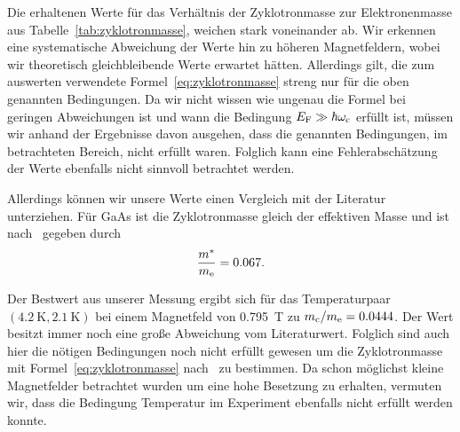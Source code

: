 \documentclass[paper=a4,fontsize=10pt,DIV=18,twocolumn,parskip=half]{scrartcl}
\numberwithin{equation}{section}    %
\newcommand{\kor}[1]{{\color{darkgreen}#1}}
\begin{document}
\kor{
Die erhaltenen Werte für das Verhältnis der Zyklotronmasse zur Elektronenmasse aus Tabelle~\ref{tab:zyklotronmasse}, weichen stark voneinander ab. Wir erkennen eine systematische Abweichung der Werte hin zu höheren Magnetfeldern, wobei wir theoretisch gleichbleibende Werte erwartet hätten. Allerdings gilt, die zum auswerten verwendete Formel~\eqref{eq:zyklotronmasse} streng nur für die oben genannten Bedingungen. Da wir nicht wissen wie ungenau die Formel bei geringen Abweichungen ist und wann die Bedingung $E_{\rm F} \gg \hbar\omega_{\rm c}$ erfüllt ist, müssen wir anhand der Ergebnisse davon ausgehen, dass die genannten Bedingungen, im betrachteten Bereich, nicht erfüllt waren. Folglich kann eine Fehlerabschätzung der Werte ebenfalls nicht sinnvoll betrachtet werden.

Allerdings können wir unsere Werte einen Vergleich mit der Literatur unterziehen. Für GaAs ist die Zyklotronmasse gleich der effektiven Masse und ist nach~\citet{saarland} gegeben durch
\begin{equation}
	\frac{m^*}{m_{\rm e}} = 0.067.
\end{equation}

Der Bestwert aus unserer Messung ergibt sich für das Temperaturpaar $(\SI{4.2}{\kelvin},\SI{2.1}{\kelvin})$ bei einem Magnetfeld von \SI{0.795}{\tesla} zu $m_{\rm c}/m_{\rm e} = 0.0444$. Der Wert besitzt immer noch eine große Abweichung vom Literaturwert. Folglich sind auch hier die nötigen Bedingungen noch nicht erfüllt gewesen um die Zyklotronmasse mit Formel~\eqref{eq:zyklotronmasse} nach~\citet{ando} zu bestimmen.
Da schon möglichst kleine Magnetfelder betrachtet wurden um eine hohe Besetzung zu erhalten, vermuten wir, dass die Bedingung Temperatur im Experiment ebenfalls nicht erfüllt werden konnte.
}

\end{document}
